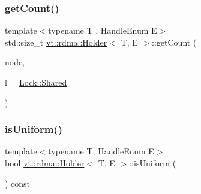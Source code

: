 \mbox{\label{structvt_1_1rdma_1_1_holder_a13c46ec783f1df901cfd7db7f65e0e85}} 
\subsubsection{\texorpdfstring{get\+Count()}{getCount()}}
{\footnotesize\ttfamily template$<$typename T , Handle\+Enum E$>$ \\
std\+::size\+\_\+t \hyperlink{structvt_1_1rdma_1_1_holder}{vt\+::rdma\+::\+Holder}$<$ T, E $>$\+::get\+Count (\begin{DoxyParamCaption}\item[{\hyperlink{namespacevt_a866da9d0efc19c0a1ce79e9e492f47e2}{vt\+::\+Node\+Type}}]{node,  }\item[{\hyperlink{namespacevt_1_1rdma_ac5c20b41a653e520b6305d4d454ecb70}{Lock}}]{l = {\ttfamily \hyperlink{namespacevt_1_1rdma_ac5c20b41a653e520b6305d4d454ecb70aa6156ea9d66fef24e87e841fbabf7cca}{Lock\+::\+Shared}} }\end{DoxyParamCaption})}

\mbox{\label{structvt_1_1rdma_1_1_holder_af5a5f41fb16fbf8ee0f7f1b51120cb65}} 
\subsubsection{\texorpdfstring{is\+Uniform()}{isUniform()}}
{\footnotesize\ttfamily template$<$typename T, Handle\+Enum E$>$ \\
bool \hyperlink{structvt_1_1rdma_1_1_holder}{vt\+::rdma\+::\+Holder}$<$ T, E $>$\+::is\+Uniform (\begin{DoxyParamCaption}{ }\end{DoxyParamCaption}) const\hspace{0.3cm}{\ttfamily [inline]}}

\mbox{\label{structvt_1_1rdma_1_1_holder_a31433de5996d42f49a16fe0f05bd51cf}} 
